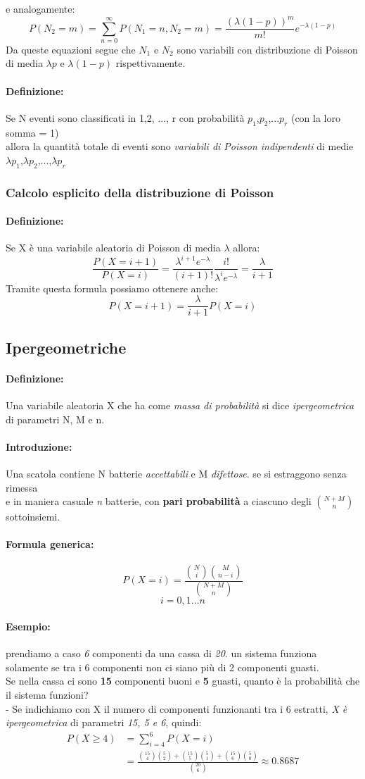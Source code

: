 \documentclass[]{article}
\newcommand{\definizione}{\paragraph{Definizione:}}
\newcommand{\formula}{\paragraph{Formula generica:}}
\begin{document}
    e analogamente:
    \[ P(N_2 = m) = \sum_{n = 0}^{\infty} P(N_1 =n, N_2 = m) = \frac{(\lambda (1-p))^m}{m!} e^{-\lambda (1-p)} \]
    Da queste equazioni segue che $N_1$ e $N_2$ sono variabili con distribuzione di Poisson di media $\lambda p$ e $\lambda (1-p)$ rispettivamente.

    \definizione Se N eventi sono classificati in 1,2, ..., r con probabilità $p_1$,$p_2$,...$p_r$ (con la loro somma = 1) \\
    allora la quantità totale di eventi sono \textit{variabili di Poisson indipendenti} di medie $\lambda p_1$,$\lambda p_2$,...,$\lambda p_r$
    \subsubsection{Calcolo esplicito della distribuzione di Poisson}
    \definizione Se X è una variabile aleatoria di Poisson di media $\lambda$ allora:
    \[ \frac{P(X = i + 1)}{P(X = i)} = \frac{\lambda^{i+1} e^{-\lambda}}{(i+1)!} \frac{i!}{\lambda^i e^{-\lambda}} = \frac{\lambda}{i + 1} \]
    Tramite questa formula possiamo ottenere anche:
    \[ P(X = i + 1) = \frac{\lambda}{i + 1} P(X = i) \]
    \subsection{Ipergeometriche}
    \definizione Una variabile aleatoria X che ha come \textit{massa di probabilità} si dice \textit{ipergeometrica} di parametri N, M e n.
    \paragraph{Introduzione:}
    Una scatola contiene N batterie \textit{accettabili} e M \textit{difettose}. se si estraggono senza rimessa \\
    e in maniera casuale \textit{n} batterie, con \textbf{pari probabilità} a ciascuno degli $\binom{N + M}{n}$ sottoinsiemi.
    \formula
    \[  P(X = i) = \frac{\binom{N}{i} \binom{M}{n - i}}{\binom{N + M}{n}} \]
    \[ i = 0,1 \ldots n \]
    \paragraph{Esempio:} prendiamo a caso \textit{6} componenti da una cassa di \textit{20}. un sistema funziona solamente se tra i 6 componenti
    non ci siano più di 2 componenti guasti. \\
    Se nella cassa ci sono \textbf{15} componenti buoni e \textbf{5} guasti, quanto è la probabilità che il sistema funzioni? \\
    - Se indichiamo con X il numero di componenti funzionanti tra i 6 estratti, \textit{X è ipergeometrica} di parametri \textit{15, 5 e 6}, quindi:
    \begin{equation*}
        \begin{split}
            P(X \geq 4) &= \sum_{i = 4}^{6} P(X = i) \\
            & = \frac{\binom{15}{4} \binom{5}{2} + \binom{15}{5} \binom{5}{1} + \binom{15}{6} \binom{5}{0}}{\binom{20}{6}} \approx 0.8687
        \end{split}
    \end{equation*}
\end{document}
